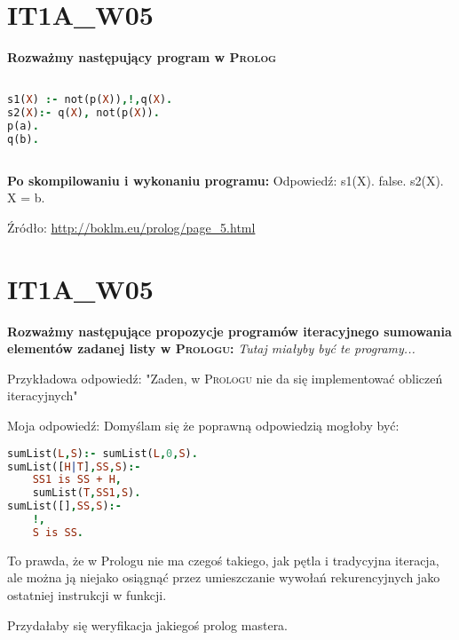 \section{IT1A\_W05}

\textbf{Rozważmy następujący program w \textsc{Prolog}}
\begin{lstlisting}[language=Prolog, frame=trbl]

s1(X) :- not(p(X)),!,q(X).
s2(X):- q(X), not(p(X)).
p(a).
q(b).
	
\end{lstlisting}
\textbf{Po skompilowaniu i wykonaniu programu:}
\vspace{0.4cm}
Odpowiedź: \newline
s1(X). \newline
false. \newline
		\newline
s2(X).  \newline
X = b.  \newline

\vspace{0.4cm}
Źródło: \url{http://boklm.eu/prolog/page_5.html} \newline


\section{IT1A\_W05}

\textbf{Rozważmy następujące propozycje programów iteracyjnego sumowania elementów zadanej listy w \textsc{Prologu}:}
\textit{Tutaj miałyby być te programy...}

\vspace{0.4cm}
Przykładowa odpowiedź: \newline
"Zaden, w \textsc{Prologu} nie da się implementować obliczeń iteracyjnych"

Moja odpowiedź:\newline
Domyślam się że poprawną odpowiedzią mogłoby być:
\begin{lstlisting}[language=prolog, frame=trbl]
sumList(L,S):- sumList(L,0,S).
sumList([H|T],SS,S):-
	SS1 is SS + H,
	sumList(T,SS1,S).
sumList([],SS,S):-
	!,
    S is SS.
\end{lstlisting}
To prawda, że w Prologu nie ma czegoś takiego, jak pętla i tradycyjna iteracja, ale można ją niejako osiągnąć przez umieszczanie wywołań rekurencyjnych jako ostatniej instrukcji w funkcji. 

Przydałaby się weryfikacja jakiegoś prolog mastera.

